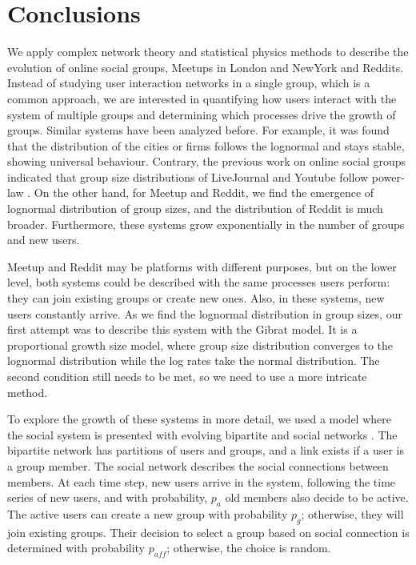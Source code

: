 \newpage
\section{Conclusions}

We apply complex network theory and statistical physics methods to describe the evolution of online social groups, Meetups in London and NewYork and Reddits. Instead of studying user interaction networks in a single group, which is a common approach, we are interested in quantifying how users interact with the system of multiple groups and determining which processes drive the growth of groups. Similar systems have been analyzed before. For example, it was found that the distribution of the cities or firms follows the lognormal and stays stable, showing universal behaviour. Contrary, the previous work on online social groups indicated that group size distributions of LiveJournal and Youtube follow power-law \cite{zheleva2009co}. On the other hand, for Meetup and Reddit, we find the emergence of lognormal distribution of group sizes, and the distribution of Reddit is much broader. Furthermore, these systems grow exponentially in the number of groups and new users. 

Meetup and Reddit may be platforms with different purposes, but on the lower level, both systems could be described with the same processes users perform: they can join existing groups or create new ones. Also, in these systems, new users constantly arrive. As we find the lognormal distribution in group sizes, our first attempt was to describe this system with the Gibrat model. It is a proportional growth size model, where group size distribution converges to the lognormal distribution while the log rates take the normal distribution. The second condition still needs to be met, so we need to use a more intricate method.

To explore the growth of these systems in more detail, we used a model where the social system is presented with evolving bipartite and social networks \cite{zheleva2009co}. The bipartite network has partitions of users and groups, and a link exists if a user is a group member. The social network describes the social connections between members. At each time step, new users arrive in the system, following the time series of new users, and with probability, $p_a$ old members also decide to be active. The active users can create a new group with probability $p_g$; otherwise, they will join existing groups. Their decision to select a group based on social connection is determined with probability $p_{aff}$; otherwise, the choice is random. %

